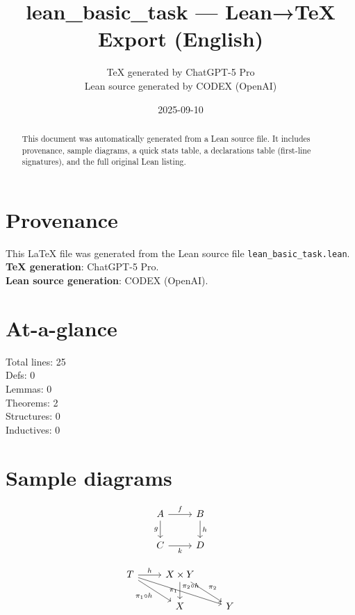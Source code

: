 \documentclass[12pt]{article}
\title{lean\_basic\_task — Lean→TeX Export (English)}
\author{TeX generated by ChatGPT-5 Pro\\Lean source generated by CODEX (OpenAI)}
\date{2025-09-10}
\begin{document}
\maketitle

\begin{abstract}
This document was automatically generated from a Lean source file. It includes provenance, sample diagrams, a quick stats table, a declarations table (first-line signatures), and the full original Lean listing.
\end{abstract}

\section*{Provenance}
This \LaTeX{} file was generated from the Lean source file \texttt{lean\_basic\_task.lean}.\\
\textbf{TeX generation}: ChatGPT-5 Pro.\\
\textbf{Lean source generation}: CODEX (OpenAI).

\section*{At-a-glance}
Total lines: 25\\
Defs: 0\\
Lemmas: 0\\
Theorems: 2\\
Structures: 0\\
Inductives: 0

\section*{Sample diagrams}

\[
\begin{tikzcd}
A \arrow[r, "f"] \arrow[d, "g"'] & B \arrow[d, "h"] \\
C \arrow[r, "k"'] & D
\end{tikzcd}
\]



\[
\begin{tikzcd}
T \arrow[r, "h"] \arrow[dr, swap, "\pi_1\circ h"] \arrow[drr, "\pi_2\circ h"] & X\times Y \arrow[d, swap, "\pi_1"] \arrow[dr, "\pi_2"] \\
& X & Y
\end{tikzcd}
\]
\end{document}
